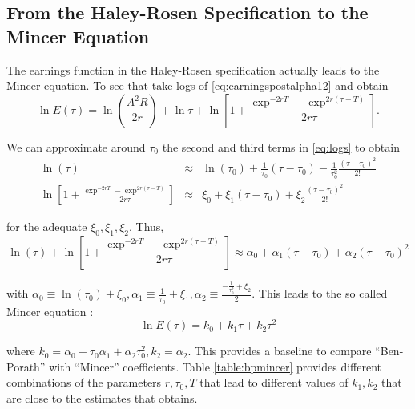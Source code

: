 \subsection{From the Haley-Rosen Specification to the Mincer Equation}
The earnings function in the Haley-Rosen specification actually leads to the Mincer equation. To see that take logs of \eqref{eq:earningspostalpha12} and obtain
\begin{equation}
\ln E(\tau) = \ln \left( \frac{A^2 R}{ 2r} \right) + \ln \tau + \ln \left[ 1 + \frac{\exp^{-2rT} - \exp^{2r(\tau - T)} }{2r \tau} \right]. \label{eq:logs}
\end{equation}

\indent We can approximate around $\tau_{0}$ the second and third terms in \eqref{eq:logs} to obtain
\begin{eqnarray}
\ln(\tau) &\approx& \ln (\tau_{0}) + \frac{1}{\tau_{0}} \left( \tau - \tau_{0} \right) - \frac{1}{\tau_{0}^2} \frac{\left( \tau - \tau_{0} \right)^2}{2!} \nonumber \\
\ln \left[ 1 + \frac{\exp^{-2rT} - \exp^{2r(\tau - T)} }{2r \tau} \right] &\approx& \xi_{0} + \xi_{1} \left( \tau - \tau_{0} \right) + \xi_{2} \frac{\left( \tau - \tau_{0} \right)^2}{2!}
\end{eqnarray}

\noindent for the adequate $\xi_{0}, \xi_{1}, \xi_{2}$. Thus,
\begin{equation}
\ln(\tau) + \ln \left[ 1 + \frac{\exp^{-2rT} - \exp^{2r(\tau - T)} }{2r \tau} \right] \approx \alpha_{0} + \alpha_{1}\left( \tau - \tau_{0} \right) + \alpha_{2} \left( \tau - \tau_{0} \right)^2
\end{equation}

\noindent with $\alpha_{0} \equiv \ln(\tau_{0}) + \xi_{0}, \alpha_{1} \equiv \frac{1}{\tau_{0}} + \xi_{1}, \alpha_{2} \equiv \frac{-\frac{1}{\tau_{0}^2} + \xi_{2}}{2}$. This leads to the so called Mincer equation \citep[see][]{mincer1974schooling}:
\begin{equation}
\ln E(\tau) = k_{0} + k_{1} \tau + k_{2} \tau^2 \label{eq:mincer}
\end{equation}

\noindent where $k_{0} = \alpha_{0} - \tau_{0} \alpha_{1} + \alpha_{2} \tau_{0}^2, k_{2} = \alpha_{2}$. This provides a baseline to compare ``Ben-Porath'' with ``Mincer'' coefficients. Table \ref{table:bpmincer} provides different combinations of the parameters $r, \tau_{0}, T$ that lead to different values of $k_{1}, k_{2}$ that are close to the estimates that \citet{mincer1974schooling} obtains.

